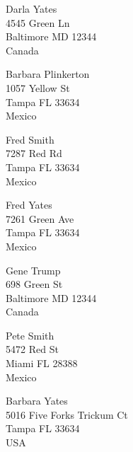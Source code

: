 \documentclass{article}
\begin{document}
\begin{center}
\begin{Huge}

\vspace*{\fill}
Darla Yates\\
4545 Green Ln\\
Baltimore MD 12344\\
Canada
\vspace{\fill}

\clearpage

\vspace*{\fill}
Barbara Plinkerton\\
1057 Yellow St\\
Tampa FL 33634\\
Mexico
\vspace{\fill}

\clearpage

\vspace*{\fill}
Fred Smith\\
7287 Red Rd\\
Tampa FL 33634\\
Mexico
\vspace{\fill}

\clearpage

\vspace*{\fill}
Fred Yates\\
7261 Green Ave\\
Tampa FL 33634\\
Mexico
\vspace{\fill}

\clearpage

\vspace*{\fill}
Gene Trump\\
698 Green St\\
Baltimore MD 12344\\
Canada
\vspace{\fill}

\clearpage

\vspace*{\fill}
Pete Smith\\
5472 Red St\\
Miami FL 28388\\
Mexico
\vspace{\fill}

\clearpage

\vspace*{\fill}
Barbara Yates\\
5016 Five Forks Trickum Ct\\
Tampa FL 33634\\
USA
\vspace{\fill}


\end{Huge}
\end{center}
\end{document}
